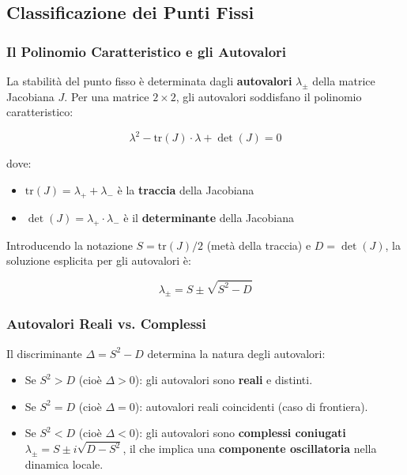 \subsection{Classificazione dei Punti Fissi}

\subsubsection{Il Polinomio Caratteristico e gli Autovalori}

La stabilità del punto fisso è determinata dagli \textbf{autovalori} $\lambda_{\pm}$ della matrice Jacobiana $J$. Per una matrice $2 \times 2$, gli autovalori soddisfano il polinomio caratteristico:

\begin{equation}
\lambda^2 - \text{tr}(J) \cdot \lambda + \det(J) = 0
\end{equation}

dove:
\begin{itemize}
    \item $\text{tr}(J) = \lambda_+ + \lambda_-$ è la \textbf{traccia} della Jacobiana
    \item $\det(J) = \lambda_+ \cdot \lambda_-$ è il \textbf{determinante} della Jacobiana
\end{itemize}

Introducendo la notazione $S = \text{tr}(J)/2$ (metà della traccia) e $D = \det(J)$, la soluzione esplicita per gli autovalori è:

\begin{equation}
\lambda_{\pm} = S \pm \sqrt{S^2 - D}
\end{equation}

\subsubsection{Autovalori Reali vs. Complessi}

Il discriminante $\Delta = S^2 - D$ determina la natura degli autovalori:
\begin{itemize}
    \item Se $S^2 > D$ (cioè $\Delta > 0$): gli autovalori sono \textbf{reali} e distinti.
    \item Se $S^2 = D$ (cioè $\Delta = 0$): autovalori reali coincidenti (caso di frontiera).
    \item Se $S^2 < D$ (cioè $\Delta < 0$): gli autovalori sono \textbf{complessi coniugati} $\lambda_{\pm} = S \pm i\sqrt{D - S^2}$, il che implica una \textbf{componente oscillatoria} nella dinamica locale.
\end{itemize}

